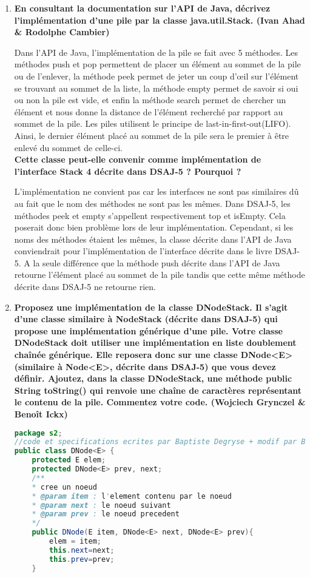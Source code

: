 \documentclass[a4paper]{article}
\begin{document}
\begin{enumerate}
	\item\textbf{En consultant la documentation sur l’API de Java, décrivez l’implémentation d’une pile par la classe java.util.Stack. (Ivan Ahad \& Rodolphe Cambier)}
	
	Dans l’API de Java, l’implémentation de la pile se fait avec 5 méthodes. Les méthodes push et pop permettent de placer un élément au sommet de la pile ou de l’enlever, la méthode peek permet de jeter un coup d’œil sur l’élément se trouvant au sommet de la liste, la méthode empty permet de savoir si oui ou non la pile est vide, et enfin la méthode search permet de chercher un élément et nous donne la distance de l’élément recherché par rapport au sommet de la pile. Les piles utilisent le principe de last-in-first-out(LIFO). Ainsi, le dernier élément placé au sommet de la pile sera le premier à être enlevé du sommet de celle-ci.\\
	
	\textbf{Cette classe peut-elle convenir comme implémentation de l’interface Stack 4 décrite dans DSAJ-5 ? Pourquoi ?}
	
	L’implémentation ne convient pas car les interfaces ne sont pas similaires dû au fait que le nom des méthodes ne sont pas les mêmes. Dans DSAJ-5, les méthodes peek et empty s’appellent respectivement top et isEmpty. Cela poserait donc bien problème lors de leur implémentation. Cependant, si les noms des méthodes étaient les mêmes, la classe décrite dans l’API de Java conviendrait pour l’implémentation de l’interface décrite dans le livre DSAJ-5. A la seule différence que la méthode push décrite dans l’API de Java retourne l’élément placé au sommet de la pile tandis que cette même méthode décrite dans DSAJ-5 ne retourne rien.

	\newpage
	\item\textbf{Proposez une implémentation de la classe DNodeStack. Il s’agit d’une classe
	similaire à NodeStack (décrite dans DSAJ-5) qui propose une implémentation
	générique d’une pile. Votre classe DNodeStack doit utiliser une implémentation
	en liste doublement chaînée générique. Elle reposera donc sur une classe
	DNode<E> (similaire à Node<E>, décrite dans DSAJ-5) que vous devez définir.
	Ajoutez, dans la classe DNodeStack, une méthode public String toString()
	qui renvoie une chaîne de caractères représentant le contenu de la pile. Commentez
	votre code. (Wojciech Grynczel \& Benoît Ickx)}\\
	
		\begin{lstlisting}[language=Java, caption=DNode.java]
package s2;
//code et specifications ecrites par Baptiste Degryse + modif par Benoit Ickx
public class DNode<E> {
	protected E elem;
	protected DNode<E> prev, next;
	/**
	* cree un noeud 
	* @param item : l'element contenu par le noeud
	* @param next : le noeud suivant
	* @param prev : le noeud precedent
	*/
	public DNode(E item, DNode<E> next, DNode<E> prev){
		elem = item;
		this.next=next;
		this.prev=prev;
	}
	

\end{lstlisting}
\end{enumerate}
\end{document}
